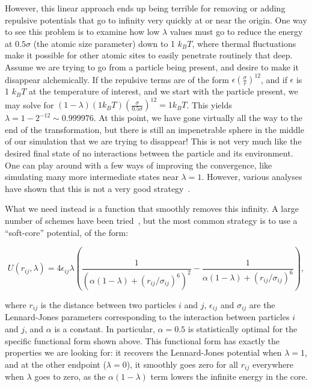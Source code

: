 \documentclass[9pt,bestpractices]{livecoms}
\begin{document}
However, this linear approach ends up being terrible for removing or adding repulsive potentials that go to infinity very quickly at or near the origin. One way to see this problem is to examine how low $\lambda$ values must go to reduce the energy at $0.5\sigma$ (the atomic size parameter) down to 1 $k_BT$, where thermal fluctuations make it possible for other atomic sites to easily penetrate routinely that deep. Assume we are trying to go from a particle being present, and desire to make it disappear alchemically. If the repulsive terms are of the form $\epsilon(\frac{\sigma}{r})^{12}$, and if $\epsilon$ is 1 $k_BT$ at the temperature of interest, and we start with the particle present, we may solve for $(1-\lambda)(1 k_B T)\left(\frac{\sigma}{0.5\sigma}\right)^{12} = 1 k_B T$. This yields $\lambda = 1-2^{-12} \sim 0.999976$. At this point,  we have gone virtually all the way to the end of the transformation, but there is still an impenetrable sphere in the middle of our simulation that we are trying to disappear! This is not very much like the desired final state of no interactions between the particle and its environment. One can play around with a few ways of improving the convergence, like simulating many more intermediate states near $\lambda=1$. However, various analyses have shown that this is not a very good strategy~\cite{pham2011identifying, beutler1994avoiding, zacharias1994separationshifted, blondel2004ensemble, gapsys2012new}.

What we need instead is a function that smoothly removes this infinity. A large number of schemes have been tried~\cite{beutler1994avoiding, zacharias1994separationshifted, blondel2004ensemble, pham2011identifying, pham2012optimal, naden2014linear, donnini2005incorporating,gapsys2012new}, but the most common strategy is to use a ``soft-core'' potential, of the form:

\begin{equation}
    U(r_{ij},\lambda) = 4\epsilon_{ij} \lambda \left(\frac{1}{(\alpha(1-\lambda) + (r_{ij}/\sigma_{ij})^6)^2} -  \frac{1}{\alpha(1-\lambda) + (r_{ij}/\sigma_{ij})^6}\right)
    \label{eq:softcore},
\end{equation}

where $r_{ij}$ is the distance between two particles $i$ and $j$, $\epsilon_{ij}$ and $\sigma_{ij}$ are the Lennard-Jones parameters corresponding to the interaction between particles $i$ and $j$, and $\alpha$ is a constant. In particular, $\alpha=0.5$ is statistically optimal for the specific functional form shown above. This functional form has exactly the properties we are looking for: it recovers the Lennard-Jones potential when $\lambda=1$, and at the other endpoint ($\lambda=0$), it smoothly goes zero for all $r_{ij}$ everywhere when $\lambda$ goes to zero, as the $\alpha(1-\lambda)$ term lowers the infinite energy in the core. 
\end{document}
